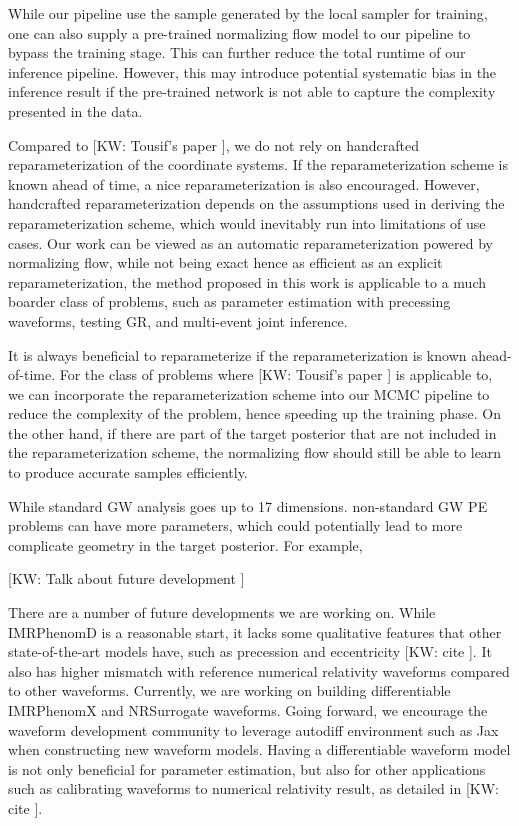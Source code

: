 \documentclass[twocolumn]{aastex631}
\newcommand{\kw}[1]{{\color{rb4}[KW: #1 ]}}
\begin{document}
While our pipeline use the sample generated by the local sampler for training,
one can also supply a pre-trained normalizing flow model to our pipeline to
bypass the training stage. This can further reduce the total runtime of our
inference pipeline. However, this may introduce potential systematic bias in the
inference result if the pre-trained network is not able to capture the
complexity presented in the data.

Compared to \kw{Tousif's paper}, we do not rely on handcrafted
reparameterization of the coordinate systems. If the reparameterization scheme
is known ahead of time, a nice reparameterization is also encouraged. However,
handcrafted reparameterization depends on the assumptions used in deriving the
reparameterization scheme, which would inevitably run into limitations of use
cases. Our work can be viewed as an automatic reparameterization powered by
normalizing flow, while not being exact hence as efficient as an explicit
reparameterization, the method proposed in this work is applicable to a much
boarder class of problems, such as parameter estimation with precessing
waveforms, testing GR, and multi-event joint inference.

It is always beneficial to reparameterize if the reparameterization is known
ahead-of-time. For the class of problems where \kw{Tousif's paper} is applicable
to, we can incorporate the reparameterization scheme into our MCMC pipeline to
reduce the complexity of the problem, hence speeding up the training phase.
On the other hand, if there are part of the target posterior that are not
included in the reparameterization scheme, the normalizing flow should still be
able to learn to produce accurate samples efficiently.


While standard GW analysis goes up to 17 dimensions. non-standard GW PE problems
can have more parameters, which could potentially lead to more complicate
geometry in the target posterior. For example, 

\kw{Talk about future development}


There are a number of future developments we are working on. While IMRPhenomD is
a reasonable start, it lacks some qualitative features that other
state-of-the-art models have, such as precession and eccentricity \kw{cite}. It
also has higher mismatch with reference numerical relativity waveforms compared
to other waveforms. Currently, we are working on building differentiable
IMRPhenomX and NRSurrogate waveforms. Going forward, we encourage the waveform
development community to leverage autodiff environment such as Jax when
constructing new waveform models. Having a differentiable waveform model is not
only beneficial for parameter estimation, but also for other applications such
as calibrating waveforms to numerical relativity result, as detailed in
\kw{cite}.
\end{document}
